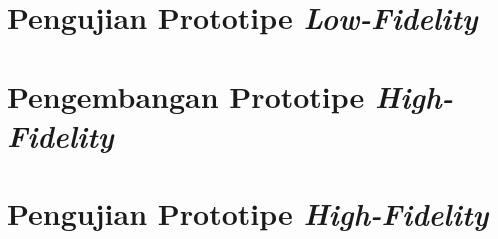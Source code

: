 \section{Pengujian Prototipe \textit{Low-Fidelity}}
\blindtext

\section{Pengembangan Prototipe \textit{High-Fidelity}}
\blindtext

\section{Pengujian Prototipe \textit{High-Fidelity}}
\blindtext